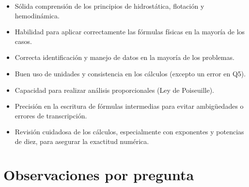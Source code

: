 \documentclass[11pt,a4paper]{article}
\begin{document}
\vspace{4pt}
\begin{minipage}[t]{0.48\linewidth}
  \begin{tcolorbox}[cajaFortaleza, title={Fortalezas}]
\begin{itemize}[leftmargin=1.5em, itemsep=2pt]
  \item Sólida comprensión de los principios de hidrostática, flotación y hemodinámica.
  \item Habilidad para aplicar correctamente las fórmulas físicas en la mayoría de los casos.
  \item Correcta identificación y manejo de datos en la mayoría de los problemas.
  \item Buen uso de unidades y consistencia en los cálculos (excepto un error en Q5).
  \item Capacidad para realizar análisis proporcionales (Ley de Poiseuille).
\end{itemize}
  \end{tcolorbox}
\end{minipage}
\hfill
\begin{minipage}[t]{0.48\linewidth}
  \begin{tcolorbox}[cajaMejora, title={Areas de mejora}]
\begin{itemize}[leftmargin=1.5em, itemsep=2pt]
  \item Precisión en la escritura de fórmulas intermedias para evitar ambigüedades o errores de transcripción.
  \item Revisión cuidadosa de los cálculos, especialmente con exponentes y potencias de diez, para asegurar la exactitud numérica.
\end{itemize}
  \end{tcolorbox}
\end{minipage}

\section*{Observaciones por pregunta}
\end{document}
